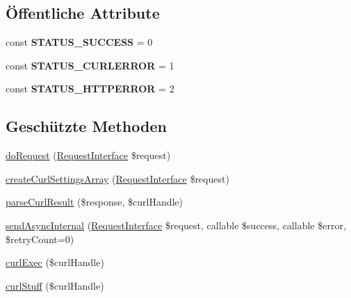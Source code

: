 \subsection*{Öffentliche Attribute}
\begin{DoxyCompactItemize}
\item 
\mbox{\label{class_sabre_1_1_h_t_t_p_1_1_client_a94b8f1933a9d3e3bb5f5e56e3c67bb1d}} 
const {\bfseries S\+T\+A\+T\+U\+S\+\_\+\+S\+U\+C\+C\+E\+SS} = 0
\item 
\mbox{\label{class_sabre_1_1_h_t_t_p_1_1_client_a1627bd95316adc5372758d3a83d97d8c}} 
const {\bfseries S\+T\+A\+T\+U\+S\+\_\+\+C\+U\+R\+L\+E\+R\+R\+OR} = 1
\item 
\mbox{\label{class_sabre_1_1_h_t_t_p_1_1_client_af1d3f5d565aaa4cadd0be1f121f7a0b9}} 
const {\bfseries S\+T\+A\+T\+U\+S\+\_\+\+H\+T\+T\+P\+E\+R\+R\+OR} = 2
\end{DoxyCompactItemize}
\subsection*{Geschützte Methoden}
\begin{DoxyCompactItemize}
\item 
\mbox{\hyperlink{class_sabre_1_1_h_t_t_p_1_1_client_a6dec075ac2ae52ae24888498e2d7848f}{do\+Request}} (\mbox{\hyperlink{interface_sabre_1_1_h_t_t_p_1_1_request_interface}{Request\+Interface}} \$request)
\item 
\mbox{\hyperlink{class_sabre_1_1_h_t_t_p_1_1_client_a13048b29dd1f8e97481effa149f046f7}{create\+Curl\+Settings\+Array}} (\mbox{\hyperlink{interface_sabre_1_1_h_t_t_p_1_1_request_interface}{Request\+Interface}} \$request)
\item 
\mbox{\hyperlink{class_sabre_1_1_h_t_t_p_1_1_client_a05ab65c44b05372c582637604a19a617}{parse\+Curl\+Result}} (\$response, \$curl\+Handle)
\item 
\mbox{\hyperlink{class_sabre_1_1_h_t_t_p_1_1_client_a8f51bb4997b41cb1152d92f0fb5df62a}{send\+Async\+Internal}} (\mbox{\hyperlink{interface_sabre_1_1_h_t_t_p_1_1_request_interface}{Request\+Interface}} \$request, callable \$success, callable \$error, \$retry\+Count=0)
\item 
\mbox{\hyperlink{class_sabre_1_1_h_t_t_p_1_1_client_a90a7e064ac5f70e81caad0dbd1984d8f}{curl\+Exec}} (\$curl\+Handle)
\item 
\mbox{\hyperlink{class_sabre_1_1_h_t_t_p_1_1_client_a89f0e6bec2232a1662e60ff33df89af0}{curl\+Stuff}} (\$curl\+Handle)
\end{DoxyCompactItemize}
